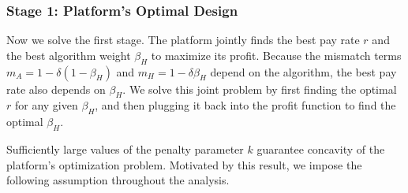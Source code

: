 



\subsubsection*{Stage 1: Platform's Optimal Design}

Now we solve the first stage. The platform jointly finds the best pay rate $r$ and the best algorithm weight $\beta_H$ to maximize its profit. Because the mismatch terms $m_A = 1 - \delta(1-\beta_H)$ and $m_H = 1 - \delta\beta_H$ depend on the algorithm, the best pay rate also depends on $\beta_H$. We solve this joint problem by first finding the optimal $r$ for any given $\beta_H$, and then plugging it back into the profit function to find the optimal $\beta_H$.





Sufficiently large values of the penalty parameter $k$ guarantee concavity of the platform's optimization problem. Motivated by this result, we impose the following assumption throughout the analysis.


